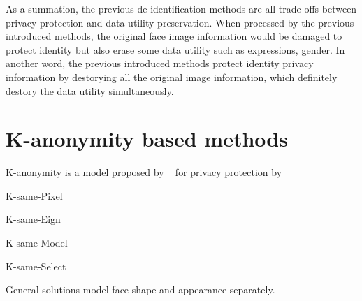	\par
	As a summation, the previous de-identification methods are all trade-offs between privacy protection and data utility preservation. When processed by the previous introduced methods, the original face image information would be damaged to protect identity but also erase some data utility such as expressions, gender. In another word, the previous introduced methods protect identity privacy information by destorying all the original image information, which definitely destory the data utility simultaneously. 

\section{K-anonymity based methods}
	K-anonymity is a model proposed by ~\cite{Sweeney02} for privacy protection by 

	\par
	K-same-Pixel

	\par
	K-same-Eign

	\par
	K-same-Model

	\par
	K-same-Select
	
	General solutions model face shape and appearance separately. 